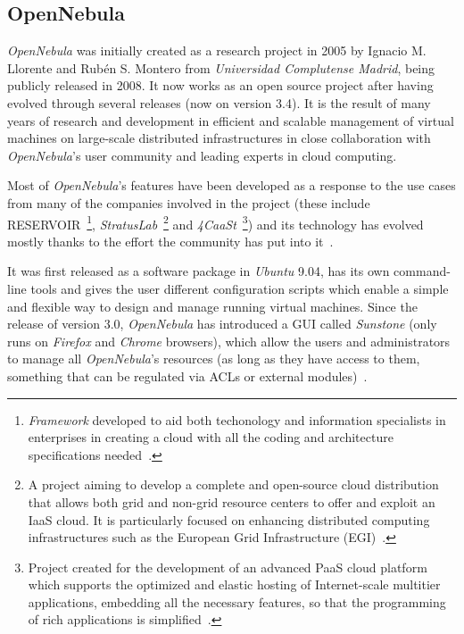 \subsection{OpenNebula}\label{subsec:opennebula}


\textit{OpenNebula} was initially created as a research project in 2005 by Ignacio M. Llorente and Rubén S. Montero from \textit{Universidad Complutense Madrid}, being publicly released in 2008. It now works as an open source project after having evolved through several releases (now on version 3.4). It is the result of many years of research and development in efficient and scalable management of virtual machines on large-scale distributed infrastructures in close collaboration with \textit{OpenNebula}'s user community and leading experts in cloud computing. 

Most of \textit{OpenNebula}'s features have been developed as a response to the use cases from many of the companies involved in the project (these include RESERVOIR~\footnote{\textit{Framework} developed to aid both techonology and information specialists in enterprises in creating a cloud with all the coding and architecture specifications needed~\cite{reservoir}.}, \textit{StratusLab}~\footnote{A project aiming to develop a complete and open-source cloud distribution that allows both grid and non-grid resource centers to offer and exploit an IaaS cloud. It is particularly focused on enhancing distributed computing infrastructures such as the European Grid Infrastructure (EGI)~\cite{stratuslab}.} and \textit{4CaaSt}~\footnote{Project created for the development of an advanced PaaS cloud platform which supports the optimized and elastic hosting of Internet-scale multitier applications, embedding all the necessary features, so that the programming of rich applications is simplified~\cite{4caast}.}) and its technology has evolved mostly thanks to the effort the community has put into it~\cite{opennebula}.

It was first released as a software package in \textit{Ubuntu} 9.04, has its own command-line tools and gives the user different configuration scripts which enable a simple and flexible way to design and manage running virtual machines. Since the release of version 3.0, \textit{OpenNebula} has introduced a GUI called \textit{Sunstone} (only runs on \textit{Firefox} and \textit{Chrome} browsers), which allow the users and administrators to manage all \textit{OpenNebula}'s resources (as long as they have access to them, something that can be regulated via ACLs or external modules)~\cite{jorge-ruao}.

